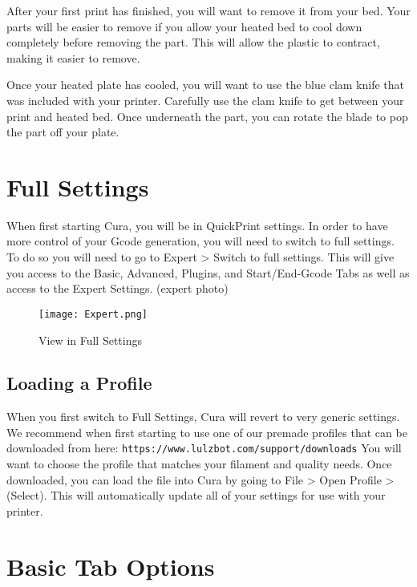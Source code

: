 After your first print has finished, you will want to remove it from your bed. Your parts will be easier to remove if you allow your heated bed to cool down completely before removing the part. This will allow the plastic to contract, making it easier to remove.

Once your heated plate has cooled, you will want to use the blue clam knife that was included with your printer. Carefully use the clam knife to get between your print and heated bed. Once underneath the part, you can rotate the blade to pop the part off your plate.

\section{Full Settings}

When first starting Cura, you will be in QuickPrint settings. In order to have more control of your Gcode generation, you will need to switch to full settings. To do so you will need to go to Expert > Switch to full settings. This will give you access to the Basic, Advanced, Plugins, and Start/End-Gcode Tabs as well as access to the Expert Settings. (expert photo)
\begin{figure}[hbt]
\centering
\texttt{[image: Expert.png]}
\caption{View in Full Settings}
\label{fig:Full Settings View}
\end{figure}

\subsection{Loading a Profile}

When you first switch to Full Settings, Cura will revert to very generic settings. We recommend when first starting to use one of our premade profiles that can be downloaded from here: \texttt{https://www.lulzbot.com/support/downloads} You will want to choose the profile that matches your filament and quality needs. Once downloaded, you can load the file into Cura by going to File > Open Profile > (Select). This will automatically update all of your settings for use with your printer.

\section{Basic Tab Options}

